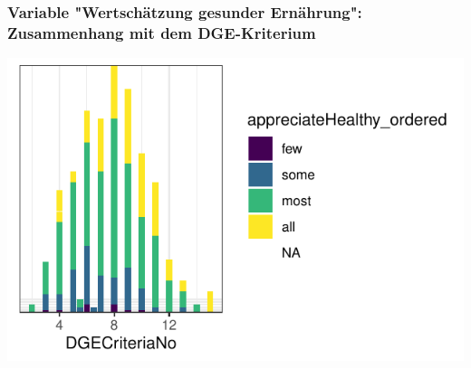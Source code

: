 \begin{frame}[fragile]
\frametitle{Variable "Wertschätzung gesunder Ernährung": Zusammenhang mit dem DGE-Kriterium}
\begin{knitrout}\footnotesize
{}\color{fgcolor}\begin{kframe}


{\ttfamily\noindent\color{warningcolor}{\#\# Warning: Removed 244 rows containing missing values (position\_stack).}}\end{kframe}

{\centering \includegraphics[width=\maxwidth]{figure/beamer-appreciateDGEplot-1} 

}



\end{knitrout}
\end{frame} 

